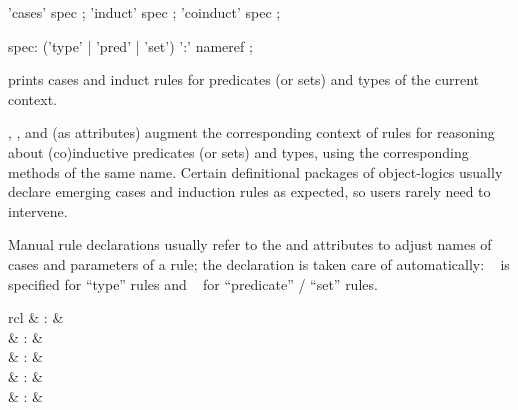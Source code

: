 \begin{isabellebody}
\begin{isamarkuptext}
  \begin{rail}
    'cases' spec
    ;
    'induct' spec
    ;
    'coinduct' spec
    ;

    spec: ('type' | 'pred' | 'set') ':' nameref
    ;
  \end{rail}

  \begin{descr}

  \item [\mbox{\isa{\isacommand{print{\isacharunderscore}induct{\isacharunderscore}rules}}}] prints cases and induct
  rules for predicates (or sets) and types of the current context.
  
  \item [\mbox{\isa{cases}}, \mbox{\isa{induct}}, and \mbox{\isa{coinduct}}] (as attributes) augment the corresponding context of
  rules for reasoning about (co)inductive predicates (or sets) and
  types, using the corresponding methods of the same name.  Certain
  definitional packages of object-logics usually declare emerging
  cases and induction rules as expected, so users rarely need to
  intervene.
  
  Manual rule declarations usually refer to the \mbox{} and \mbox{} attributes to adjust names of
  cases and parameters of a rule; the \mbox{}
  declaration is taken care of automatically: \mbox{}~ is specified for ``type'' rules and \mbox{}~ for ``predicate'' / ``set'' rules.

  \end{descr}%
\end{isamarkuptext}%
\isamarkuptrue%
%
\isamarkuptrue%
%
\begin{isamarkuptext}%
\begin{matharray}{rcl}
    \mbox{} & : &  \\
    \mbox{} & : & \isarmeth \\
    \mbox{} & : & \isaratt \\
    \mbox{} & : & \isaratt \\
    \mbox{} & : & \isaratt \\
  \end{matharray}


\end{isamarkuptext}
\end{isabellebody}
